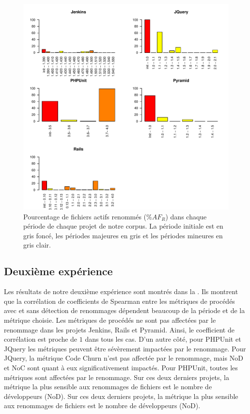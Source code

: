 \begin{figure}[h]
	\centering
	\includegraphics[width=0.85\linewidth,keepaspectratio]{data/figures/renaming2.pdf}
	\caption{Pourcentage de fichiers actifs renommés ($\%AF_R$) dans chaque période de chaque projet de notre corpus. La période initiale est en gris foncé, les périodes majeures en gris et les périodes mineures en gris clair.}
	\label{fig:renaming2}
\end{figure}

\subsection{Deuxième expérience}
Les résultats de notre deuxième expérience sont montrés dans la . Ils montrent que la corrélation de coefficients de Spearman entre les métriques de procédés avec et sans détection de renommages dépendent beaucoup de la période et de la métrique choisie. Les métriques de procédés ne sont pas affectées par le renommage dans les projets Jenkins, Rails et Pyramid. Ainsi, le coefficient de corrélation est proche de $1$ dans tous les cas. D'un autre côté, pour PHPUnit et JQuery les métriques peuvent être sévèrement impactées par le renommage. Pour JQuery, la métrique Code Churn n'est pas affectée par le renommage, mais NoD et NoC sont quant à eux significativement impactés. Pour PHPUnit, toutes les métriques sont affectées par le renommage. Sur ces deux derniers projets, la métrique la plus sensible aux renommages de fichiers est le nombre de développeurs (NoD). Sur ces deux derniers projets, la métrique la plus sensible aux renommages de fichiers est le nombre de développeurs (NoD).

